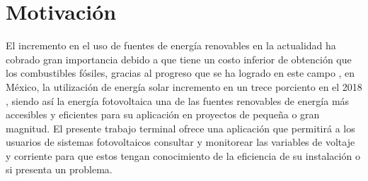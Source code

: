 \section{Motivación}
El incremento en el uso de fuentes de energía renovables en la actualidad ha cobrado gran importancia debido a que tiene un costo inferior de obtención que los combustibles fósiles, gracias al progreso que se ha logrado en este campo \citep{Not1}, en México, la utilización de energía solar incremento en un trece porciento en el 2018 \citep{Not2}, siendo así la energía fotovoltaica una de las fuentes renovables de energía más accesibles y eficientes para su aplicación en proyectos de pequeña o gran magnitud.
El presente trabajo terminal ofrece una aplicación que permitirá a los usuarios de sistemas fotovoltaicos consultar y monitorear las variables de voltaje y corriente para que estos tengan conocimiento de la eficiencia de su instalación o si presenta un problema. 
